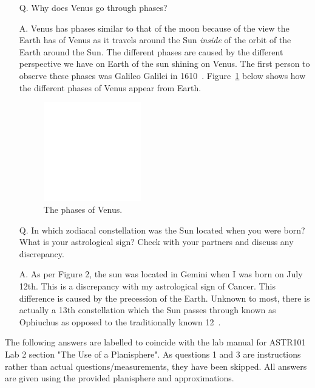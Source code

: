 \documentclass{article}
\begin{document}
\begin{enumerate}
\item[Q.] Why does Venus go through phases? 
\item[A.] Venus has phases similar to that of the moon because of the view the Earth has of Venus as it travels
around the Sun \textit{inside} of the orbit of the Earth around the Sun. The different phases are caused by the different
perspective we have on Earth of the sun shining on Venus.  The first person to observe these phases was Galileo 
Galilei in 1610~\cite{Lance:1995}. Figure~\ref{fig:pov} below shows how the different phases of
Venus appear from Earth.

\addtocounter{figure}{2}
\begin{figure}[h!]
\centering
\includegraphics[width=0.4\textwidth]{images/blank}
\caption{The phases of Venus.\label{fig:pov}}
\end{figure}

\item[Q.] In which zodiacal constellation was the Sun located when you were born? What is your astrological sign?
Check with your partners and discuss any discrepancy.
\item[A.] As per Figure 2, the sun was located in Gemini when I was born on July 12th. This is a discrepancy with
my astrological sign of Cancer. This difference is caused by the precession of the Earth. Unknown to most, there
is actually a 13th constellation which the Sun passes through known as Ophiuchus as opposed to the 
traditionally known 12~\cite{Storm:1995}.
\end{enumerate}

The following answers are labelled to coincide with the lab manual for ASTR101 Lab 2 section
"The Use of a Planisphere". As
questions 1 and 3 are instructions rather than actual questions/measurements, they have been skipped. All answers 
are given using the provided planisphere and approximations.
\end{document}
